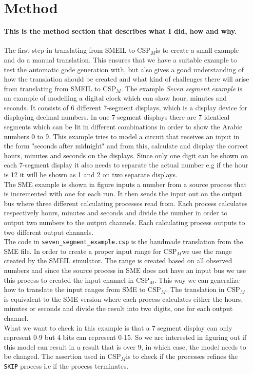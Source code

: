 \documentclass[a4paper]{report}
\newcommand{\cspm}{CSP$_M$}
\begin{document}
\chapter{Method}
\textbf{This is the method section that describes what I did, how and why.}
\\\\
The first step in translating from SMEIL to \cspm is to create a small example and do a manual translation. This ensures that we have a suitable example to test the automatic gode generation with, but also gives a good understanding of how the translation should be created and what kind of challenges there will arise from translating from SMEIL to \cspm. The example \textit{Seven segment example} is an example of modelling a digital clock which can show hour, minutes and seconds. It consists of 6 different 7-segment displays, which is a display device for displaying decimal numbers. In one 7-segment displays there are 7 identical segments which can be lit in different combinations in order to show the Arabic numbers 0 to 9. This example tries to model a circuit that receives an input in the form "seconds after midnight" and from this, calculate and display the correct hours, minutes and seconds on the displays. Since only one digit can be shown on each 7-segment display it also needs to separate the actual number e.g if the hour is 12 it will be shown as 1 and 2 on two separate displays. \\ The SME example is shown in figure  inputs a number from a source process that is incremented with one for each run. It then sends the input out on the output bus where three different calculating processes read from. Each process calculates respectively hours, minutes and seconds and divide the number in order to output two numbers to the output channels. Each calculating process outputs to two different output channels. \\ The code in \texttt{seven\_segment\_example.csp} is the handmade translation from the SME file. In order to create a proper input range for \cspm we use the range created by the SMEIL simulator. The range is created based on all observed numbers and since the source process in SME does not have an input bus we use this process to created the input channel in \cspm. This way we can generalize how to translate the input ranges from SME to \cspm. The translation in \cspm is equivalent to the SME version where each process calculates either the hours, minutes or seconds and divide the result into two digits, one for each output channel.\\ What we want to check in this example is that a 7 segment display can only represent 0-9 but 4 bits can represent 0-15. So we are interested in figuring out if this model can result in a result that is over 9, in which case, the model needs to be changed. The assertion used in \cspm is to check if the processes refines the \texttt{SKIP} process i.e if the process terminates. 
\end{document}
